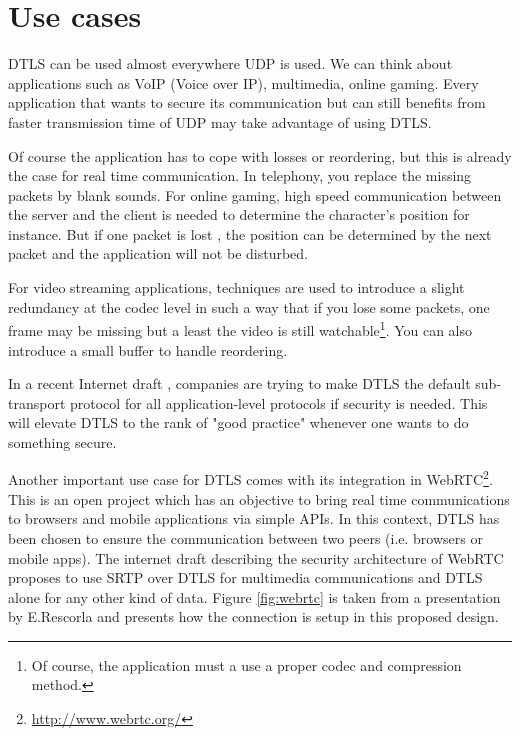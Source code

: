 \section{Use cases}

\label{sec:dtls-usage}

DTLS can be used almost everywhere UDP is used. We can think about applications such as VoIP (Voice over IP), multimedia, online gaming. Every application that wants to secure its communication but can still benefits from faster transmission time of UDP may take advantage of using DTLS.

Of course the application has to cope with losses or reordering, but this is already the case for real time communication. In telephony, you replace the missing packets by blank sounds. For online gaming, high speed communication between the server and the client is needed to determine the character's position for instance. But if one packet is lost , the position can be determined by the next packet and the application will not be disturbed.

For video streaming applications, techniques are used to introduce a slight redundancy at the codec level in such a way that if you lose some packets, one frame may be missing but a least the video is still watchable\footnote{Of course, the application must a use a proper codec and compression method.}. You can also introduce a small buffer to handle reordering.

In a recent Internet draft \cite{dtls-as-subtransport}, companies are trying to make DTLS the default sub-transport protocol for all application-level protocols if security is needed. This will elevate DTLS to the rank of "good practice" whenever one wants to do something secure. 

Another important use case for DTLS comes with its integration in WebRTC\footnote{\url{http://www.webrtc.org/}}. This is an open project which has an objective to bring real time communications to browsers and mobile applications via simple APIs. In this context, DTLS has been chosen to ensure the communication between two peers (i.e. browsers or mobile apps). The internet draft describing the security architecture of WebRTC \cite{ietf-rtcweb-security-arch} proposes to use SRTP over DTLS for multimedia communications and DTLS alone for any other kind of data. Figure \ref{fig:webrtc} is taken from a presentation \cite{rescorla2011proposed} by E.Rescorla and  presents how the connection is setup in this proposed design.  

